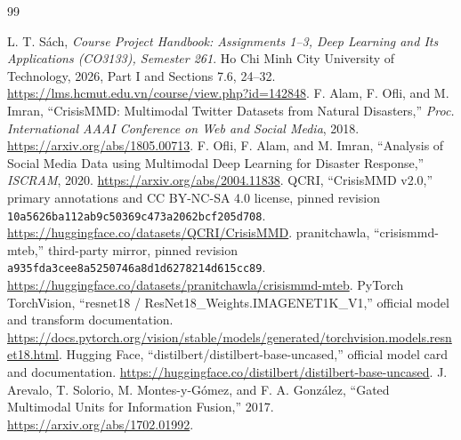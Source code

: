 \documentclass[11pt,a4paper]{article}
\begin{document}
\begin{thebibliography}{99}\raggedright\footnotesize\setlength{\itemsep}{0pt}\setlength{\parsep}{0pt}\setlength{\parskip}{0pt}
 L. T. Sách, \emph{Course Project Handbook: Assignments 1--3, Deep Learning and Its Applications (CO3133), Semester 261}. Ho Chi Minh City University of Technology, 2026, Part I and Sections 7.6, 24--32. \url{https://lms.hcmut.edu.vn/course/view.php?id=142848}.
 F. Alam, F. Ofli, and M. Imran, ``CrisisMMD: Multimodal Twitter Datasets from Natural Disasters,'' \emph{Proc. International AAAI Conference on Web and Social Media}, 2018. \url{https://arxiv.org/abs/1805.00713}.
 F. Ofli, F. Alam, and M. Imran, ``Analysis of Social Media Data using Multimodal Deep Learning for Disaster Response,'' \emph{ISCRAM}, 2020. \url{https://arxiv.org/abs/2004.11838}.
 QCRI, ``CrisisMMD v2.0,'' primary annotations and CC BY-NC-SA 4.0 license, pinned revision \texttt{10a5626ba112ab9c50369c473a}\allowbreak\texttt{2062bcf205d708}. \url{https://huggingface.co/datasets/QCRI/CrisisMMD}.
 pranitchawla, ``crisismmd-mteb,'' third-party mirror, pinned revision \texttt{a935fda3cee8a5250746a8d1d}\allowbreak\texttt{6278214d615cc89}. \url{https://huggingface.co/datasets/pranitchawla/crisismmd-mteb}.
 PyTorch TorchVision, ``resnet18 / ResNet18\_Weights.IMAGENET1K\_V1,'' official model and transform documentation. \url{https://docs.pytorch.org/vision/stable/models/generated/torchvision.models.resnet18.html}.
 Hugging Face, ``distilbert/distilbert-base-uncased,'' official model card and documentation. \url{https://huggingface.co/distilbert/distilbert-base-uncased}.
 J. Arevalo, T. Solorio, M. Montes-y-Gómez, and F. A. González, ``Gated Multimodal Units for Information Fusion,'' 2017. \url{https://arxiv.org/abs/1702.01992}.
\end{thebibliography}
\end{document}
